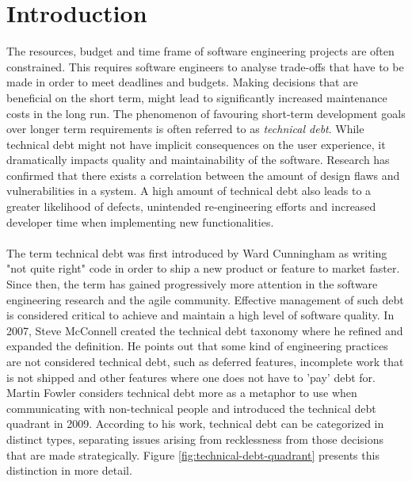 \chapter{Introduction}


The resources, budget and time frame of software engineering projects are often constrained\cite{guo2011tracking}.
This requires software engineers to analyse trade-offs that have to be made in order to meet deadlines and budgets.
Making decisions that are beneficial on the short term, might lead to significantly increased maintenance costs in the long run.
The phenomenon of favouring short-term development goals over longer term requirements is often referred to as \emph{technical debt}.
While technical debt might not have implicit consequences on the user experience, it dramatically impacts quality and maintainability of the software.
Research has confirmed that there exists a correlation between the amount of design flaws and vulnerabilities in a system\cite{nord2016debtvulnerabilities}.
A high amount of technical debt also leads to a greater likelihood of defects, unintended re-engineering\cite{li2014empirical} efforts and increased developer time when implementing new functionalities.\\\\
The term technical debt was first introduced by Ward Cunningham as writing "not quite right" code in order to ship a new product or feature to market faster\cite{cunningham1993wycash}.
Since then, the term has gained progressively more attention in the software engineering research and the agile community.
Effective management of such debt is considered critical to achieve and maintain a high level of software quality.
In 2007, Steve McConnell created the technical debt taxonomy where he refined and expanded the definition\cite{mcconnell2007debt}.
He points out that some kind of engineering practices are not considered technical debt, such as deferred features, incomplete work that is not shipped and other features where one does not have to 'pay' debt for.
Martin Fowler considers technical debt more as a metaphor to use when communicating with non-technical people and introduced the technical debt quadrant in 2009\cite{technicaldebtquadrant}.
According to his work, technical debt can be categorized in distinct types, separating issues arising from recklessness from those decisions that are made strategically. 
Figure \ref{fig:technical-debt-quadrant} presents this distinction in more detail.\\

